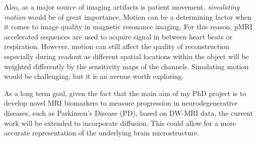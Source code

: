 Also, as a major source of imaging artifacts is patient movement, \textit{simulating motion} would be of great importance. Motion can be a determining factor when it comes to image quality in magnetic resonance imaging. For this reason, pMRI accelerated sequences are used to acquire signal in between heart beats or respiration. However, motion can still affect the quality of reconstruction especially during readout as different spatial locations within the object will be weighted differently by the sensitivity maps of the channels. Simulating motion would be challenging, but it is an avenue worth exploring.

As a long term goal, given the fact that the main aim of my PhD project is to develop novel MRI biomarkers to measure progression in neurodegenerative diseases, such as Parkinson’s Disease (PD), based on DW-MRI data, the current work will be extended to incorporate diffusion. This could allow for a more accurate representation of the underlying brain microstructure.


